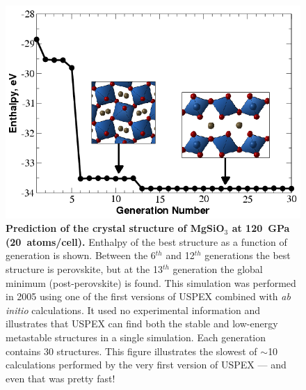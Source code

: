 \documentclass[12pt]{article}
\begin{document}
\begin{figure}[htbp] \centering
\includegraphics[scale=0.3]{pic/prediction_of_the_crystal_structure_of_MgSiO3.png}
\caption{\footnotesize \textbf{Prediction of the crystal structure of MgSiO$_3$
at 120~GPa (20~atoms/cell).} Enthalpy of the best structure as a function of
generation is shown. Between the 6$^{th}$ and 12$^{th}$ generations the best
structure is perovskite, but at the 13$^{th}$ generation the global minimum
(post-perovskite) is found. This simulation was performed in 2005 using one of
the first versions of USPEX combined with \emph{ab initio} calculations. It used
no experimental information and illustrates that USPEX can find both the stable
and low-energy metastable structures in a single simulation. Each generation
contains 30 structures. This figure illustrates the slowest of $\sim$10
calculations performed by the very first version of USPEX --- and even that was
pretty fast!}
\label{fig:structure_prediction_MgSiO3}
\end{figure}
\end{document}
